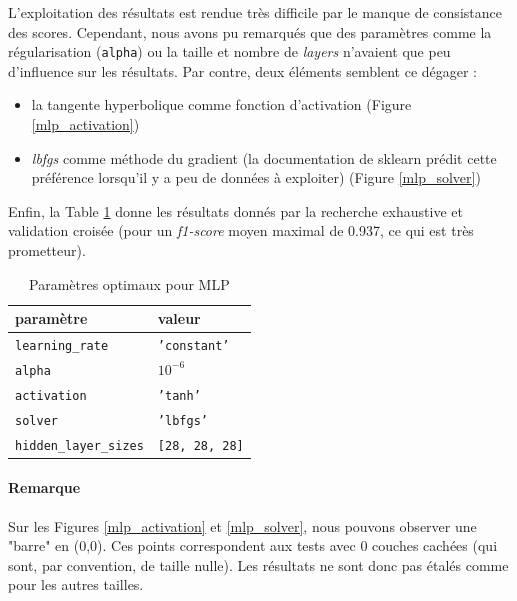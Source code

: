 \documentclass[a4paper]{report}
\begin{document}
L'exploitation des résultats est rendue très difficile par le manque de consistance des scores. Cependant, nous avons pu remarqués que des paramètres comme la régularisation (\texttt{alpha}) ou la taille et nombre de \emph{layers} n'avaient que peu d'influence sur les résultats. Par contre, deux éléments semblent ce dégager : \begin{itemize}
\item la tangente hyperbolique comme fonction d'activation (Figure \ref{mlp_activation})
\item \emph{lbfgs} comme méthode du gradient (la documentation de sklearn prédit cette préférence lorsqu'il y a peu de données à exploiter) (Figure \ref{mlp_solver})
\end{itemize}
Enfin, la Table \ref{best_params_mlp} donne les résultats donnés par la recherche exhaustive et validation croisée (pour un \emph{f1-score} moyen maximal de 0.937, ce qui est très prometteur).

\begin{table}
\centering
\begin{tabular}{ll}
paramètre & valeur \\
\hline
\texttt{learning\_rate} & \texttt{'constant'} \\
\texttt{alpha} & \texttt{$10^{-6}$} \\
\texttt{activation} & \texttt{'tanh'} \\
\texttt{solver} & \texttt{'lbfgs'} \\
\texttt{hidden\_layer\_sizes} & \texttt{[28, 28, 28]}\\
\end{tabular}
\caption{Paramètres optimaux pour MLP\label{best_params_mlp}}
\end{table}

\paragraph{Remarque} Sur les Figures \ref{mlp_activation} et \ref{mlp_solver}, nous pouvons observer une "barre" en (0,0). Ces points correspondent aux tests avec 0 couches cachées (qui sont, par convention, de taille nulle). Les résultats ne sont donc pas étalés comme pour les autres tailles.
\end{document}
